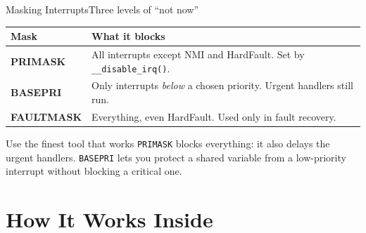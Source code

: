 \documentclass[9pt,aspectratio=169,xcolor=table]{beamer}
\begin{document}
\begin{frame}{Masking Interrupts}{Three levels of ``not now''}
    \begin{center}
    {\small
    \striped
    \begin{tabular}{@{}l R{.62\textwidth}@{}}
        \toprule
        \textbf{Mask} & \textbf{What it blocks} \\
        \midrule
        \textbf{PRIMASK} & All interrupts except NMI and HardFault. Set by \texttt{\_\_disable\_irq()}. \\
        \textbf{BASEPRI} & Only interrupts \emph{below} a chosen priority. Urgent handlers still run. \\
        \textbf{FAULTMASK} & Everything, even HardFault. Used only in fault recovery. \\
        \bottomrule
    \end{tabular}}
    \end{center}

    \vspace{3mm}
    \begin{block}{Use the finest tool that works}
        \texttt{PRIMASK} blocks everything: it also delays the urgent handlers. \texttt{BASEPRI} lets you protect a shared variable from a low-priority interrupt without blocking a critical one.
    \end{block}
\end{frame}


\section{How It Works Inside}
\end{document}
